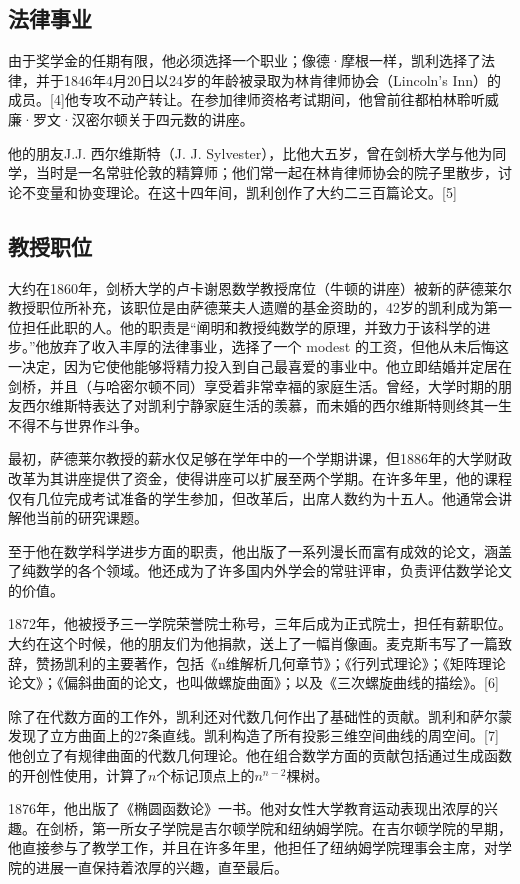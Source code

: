 \subsection{法律事业}  
由于奖学金的任期有限，他必须选择一个职业；像德·摩根一样，凯利选择了法律，并于1846年4月20日以24岁的年龄被录取为林肯律师协会（Lincoln's Inn）的成员。[4]他专攻不动产转让。在参加律师资格考试期间，他曾前往都柏林聆听威廉·罗文·汉密尔顿关于四元数的讲座。

他的朋友J.J. 西尔维斯特（J. J. Sylvester），比他大五岁，曾在剑桥大学与他为同学，当时是一名常驻伦敦的精算师；他们常一起在林肯律师协会的院子里散步，讨论不变量和协变理论。在这十四年间，凯利创作了大约二三百篇论文。[5]
\subsection{教授职位}  
大约在1860年，剑桥大学的卢卡谢恩数学教授席位（牛顿的讲座）被新的萨德莱尔教授职位所补充，该职位是由萨德莱夫人遗赠的基金资助的，42岁的凯利成为第一位担任此职的人。他的职责是“阐明和教授纯数学的原理，并致力于该科学的进步。”他放弃了收入丰厚的法律事业，选择了一个 modest 的工资，但他从未后悔这一决定，因为它使他能够将精力投入到自己最喜爱的事业中。他立即结婚并定居在剑桥，并且（与哈密尔顿不同）享受着非常幸福的家庭生活。曾经，大学时期的朋友西尔维斯特表达了对凯利宁静家庭生活的羡慕，而未婚的西尔维斯特则终其一生不得不与世界作斗争。

最初，萨德莱尔教授的薪水仅足够在学年中的一个学期讲课，但1886年的大学财政改革为其讲座提供了资金，使得讲座可以扩展至两个学期。在许多年里，他的课程仅有几位完成考试准备的学生参加，但改革后，出席人数约为十五人。他通常会讲解他当前的研究课题。

至于他在数学科学进步方面的职责，他出版了一系列漫长而富有成效的论文，涵盖了纯数学的各个领域。他还成为了许多国内外学会的常驻评审，负责评估数学论文的价值。

1872年，他被授予三一学院荣誉院士称号，三年后成为正式院士，担任有薪职位。大约在这个时候，他的朋友们为他捐款，送上了一幅肖像画。麦克斯韦写了一篇致辞，赞扬凯利的主要著作，包括《n维解析几何章节》；《行列式理论》；《矩阵理论论文》；《偏斜曲面的论文，也叫做螺旋曲面》；以及《三次螺旋曲线的描绘》。[6] 

除了在代数方面的工作外，凯利还对代数几何作出了基础性的贡献。凯利和萨尔蒙发现了立方曲面上的27条直线。凯利构造了所有投影三维空间曲线的周空间。[7]他创立了有规律曲面的代数几何理论。他在组合数学方面的贡献包括通过生成函数的开创性使用，计算了\(n\)个标记顶点上的\(n^{n-2}\)棵树。

1876年，他出版了《椭圆函数论》一书。他对女性大学教育运动表现出浓厚的兴趣。在剑桥，第一所女子学院是吉尔顿学院和纽纳姆学院。在吉尔顿学院的早期，他直接参与了教学工作，并且在许多年里，他担任了纽纳姆学院理事会主席，对学院的进展一直保持着浓厚的兴趣，直至最后。

